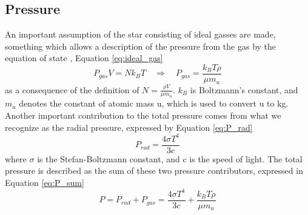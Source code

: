 \documentclass[10pt, nofootinbib, twocolumn]{revtex4-1}
\begin{document}
\subsection{Pressure}
An important assumption of the star consisting of ideal gasses are made, something which allows a description of the pressure from the gas by the equation of state \cite{therm}, Equation \eqref{eq:ideal_gas} 
\begin{equation}\label{eq:ideal_gas}
    P_{gas} V = N k_B T \quad \Rightarrow \quad  P_{gas} = \frac{k_BT\rho}{\mu m_u}
\end{equation}
as a consequence of the definition of $N=\frac{\rho V}{\mu m_u}$. $k_B$ is Boltzmann's constant, and $m_u$ denotes the constant of atomic mass u, which is used to convert u to kg. \\

Another important contribution to the total pressure comes from what we recognize as the radial pressure, expressed by Equation \eqref{eq:P_rad} \cite{ast}
\begin{equation}\label{eq:P_rad}
    P_{rad} = \frac{4\sigma T^4}{3c}
\end{equation}
where $\sigma$ is the Stefan-Boltzmann constant, and c is the speed of light. The total pressure is described as the sum of these two pressure contributors, expressed in Equation \eqref{eq:P_sum}
\begin{equation}\label{eq:P_sum}
    P = P_{rad} + P_{gas} = \frac{4\sigma T^4}{3c} + \frac{k_BT\rho}{\mu m_u}
\end{equation}
\end{document}
